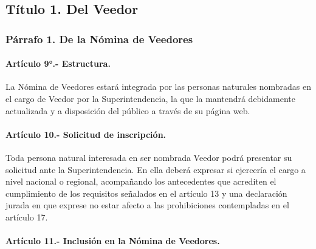 \documentclass[
]{book}
\begin{document}
\hypertarget{tuxedtulo-1.-del-veedor}{%
\subsection*{Título 1. Del Veedor}\label{tuxedtulo-1.-del-veedor}}

\hypertarget{puxe1rrafo-1.-de-la-nuxf3mina-de-veedores}{%
\subsubsection*{Párrafo 1. De la Nómina de Veedores}\label{puxe1rrafo-1.-de-la-nuxf3mina-de-veedores}}

\hypertarget{artuxedculo-9.--estructura.}{%
\paragraph*{Artículo 9°.- Estructura.}\label{artuxedculo-9.--estructura.}}

La Nómina de Veedores estará integrada por las personas naturales nombradas en el cargo de Veedor por la Superintendencia, la que la mantendrá debidamente actualizada y a disposición del público a través de su página web.

\hypertarget{artuxedculo-10.--solicitud-de-inscripciuxf3n.}{%
\paragraph*{Artículo 10.- Solicitud de inscripción.}\label{artuxedculo-10.--solicitud-de-inscripciuxf3n.}}

Toda persona natural interesada en ser nombrada Veedor podrá presentar su solicitud ante la Superintendencia. En ella deberá expresar si ejercería el cargo a nivel nacional o regional, acompañando los antecedentes que acrediten el cumplimiento de los requisitos señalados en el artículo 13 y una declaración jurada en que exprese no estar afecto a las prohibiciones contempladas en el artículo 17.

\hypertarget{artuxedculo-11.--inclusiuxf3n-en-la-nuxf3mina-de-veedores.}{%
\paragraph*{Artículo 11.- Inclusión en la Nómina de Veedores.}\label{artuxedculo-11.--inclusiuxf3n-en-la-nuxf3mina-de-veedores.}}
\end{document}
